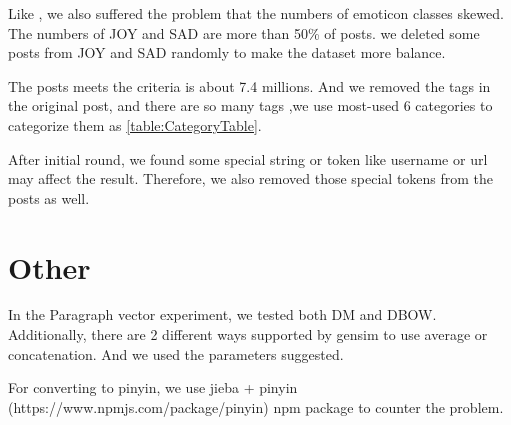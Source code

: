 Like \cite{zhao2012moodlens}, we also suffered the problem that the numbers of emoticon classes skewed. The numbers of JOY and SAD are more than 50\% of posts. 
we deleted some posts from JOY and SAD randomly to make the dataset more balance.  

The posts meets the criteria is about 7.4 millions. And we removed the tags in the original post, and there are so many tags 
,we use most-used 6 categories to categorize them as \ref{table:CategoryTable}.

After initial round, we found some special string or token like username or url may affect the result. Therefore, we also removed those special tokens from the posts as well.

\section{Other}

In the Paragraph vector experiment, we tested both DM and DBOW. Additionally, there are 2 different ways supported by gensim to use average or concatenation.
And we used the parameters suggested. 


For converting to pinyin, we use jieba + pinyin (https://www.npmjs.com/package/pinyin) npm package to counter the problem.
